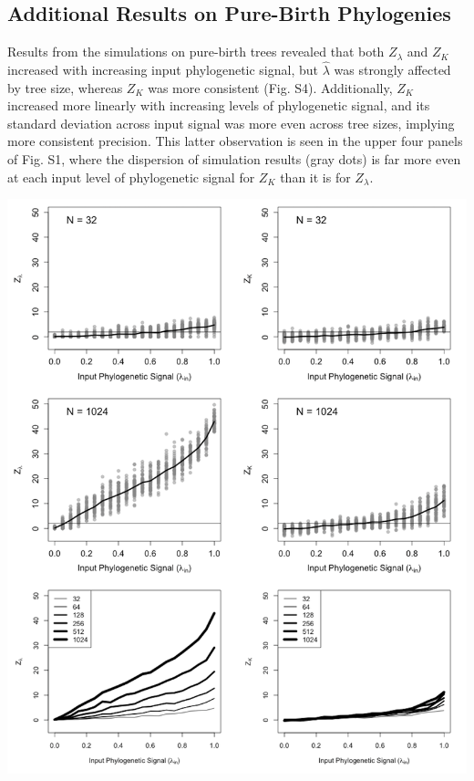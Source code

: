 \documentclass[
]{article}
\begin{document}
\hypertarget{additional-results-on-pure-birth-phylogenies}{%
\subsection{Additional Results on Pure-Birth
Phylogenies}\label{additional-results-on-pure-birth-phylogenies}}

Results from the simulations on pure-birth trees revealed that both
\(Z_{\lambda}\) and \(Z_K\) increased with increasing input phylogenetic
signal, but \(\hat{\lambda}\) was strongly affected by tree size,
whereas \(Z_K\) was more consistent (Fig. S4). Additionally, \(Z_K\)
increased more linearly with increasing levels of phylogenetic signal,
and its standard deviation across input signal was more even across tree
sizes, implying more consistent precision. This latter observation is
seen in the upper four panels of Fig. S1, where the dispersion of
simulation results (gray dots) is far more even at each input level of
phylogenetic signal for \(Z_K\) than it is for \(Z_{\lambda}\).

\includegraphics[width=0.95\linewidth]{fig.S1}
\end{document}
